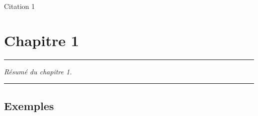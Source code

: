 
\lhead[\fancyplain{}{\leftmark}]%
      {\fancyplain{}{}} %
\chead[\fancyplain{}{}]%
      {\fancyplain{}{}}
\rhead[\fancyplain{}{}]%
      {\fancyplain{}{\rightmark}}%
\lfoot[\fancyplain{}{\thepage}]%
      {\fancyplain{}{}}
\cfoot[\fancyplain{}{}]%
      {\fancyplain{}{}} %
\rfoot[\fancyplain{}{}]%
     {\fancyplain{}{\thepage}}



\begin{savequote}[60mm]
Citation 1
\end{savequote}

\chapter{Chapitre 1}
\label{ch:1}


\begin{center}
\rule{0.7\linewidth}{.5pt}
\begin{minipage}{0.7\linewidth}
\smallskip

\textit{
Résumé du chapitre 1.
}

\end{minipage}
\smallskip
\rule{0.7\linewidth}{.5pt}
\end{center}


\adjustmtc[2]
\minitoc
\adjustmtc[-2]
\minilof
\minilot
\newpage


\section{Exemples}
